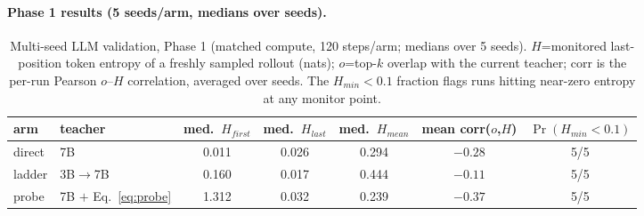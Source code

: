 \documentclass[11pt]{article}
\begin{document}
\paragraph{Phase 1 results (5 seeds/arm, medians over seeds).}
\begin{table}[h]
\centering
\caption{Multi-seed LLM validation, Phase 1 (matched compute, 120 steps/arm; medians over 5 seeds). $H$=monitored last-position token entropy of a freshly sampled rollout (nats); $o$=top-$k$ overlap with the current teacher; corr is the per-run Pearson $o$--$H$ correlation, averaged over seeds. The $H_{min}{<}0.1$ fraction flags runs hitting near-zero entropy at any monitor point.}
\label{tab:llm}
\small
\begin{adjustbox}{max width=\linewidth}
\begin{tabular}{@{}llccccc@{}}
\toprule
\textbf{arm} & \textbf{teacher} & med.\ $H_{first}$ & med.\ $H_{last}$ & med.\ $H_{mean}$ & mean corr($o$,$H$) & $\Pr(H_{min}{<}0.1)$ \\
\midrule
direct & 7B & 0.011 & 0.026 & 0.294 & $-0.28$ & 5/5 \\
ladder & 3B$\to$7B & 0.160 & 0.017 & 0.444 & $-0.11$ & 5/5 \\
probe  & 7B $+$ Eq.~\eqref{eq:probe} & 1.312 & 0.032 & 0.239 & $-0.37$ & 5/5 \\
\bottomrule
\end{tabular}
\end{adjustbox}
\end{table}
\end{document}
